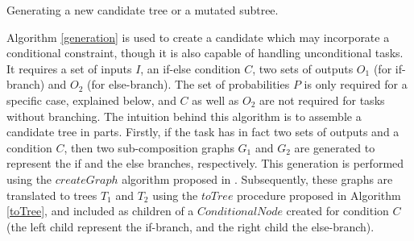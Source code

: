 \begin{algorithm}
 \setlength{}
 \LinesNumbered
 \SetNlSty{}{}{:}
 \vspace{2mm}
 \caption{\footnotesize Generating a new candidate tree or a mutated subtree.}
\label{generation}
\end{algorithm}

Algorithm \ref{generation} is used to create a candidate which may incorporate a conditional constraint, though it is also capable of handling unconditional tasks. It requires a
set of inputs $I$, an if-else condition $C$, two sets of outputs $O_1$ (for if-branch) and $O_2$ (for else-branch). The set of probabilities $P$ is only required for a specific case, explained below, and $C$ as well as $O_2$ are not required for tasks without branching. The intuition behind this algorithm is to assemble a candidate tree in parts. Firstly, if the task has in fact two sets of outputs and a condition $C$, then two sub-composition graphs $G_1$ and $G_2$ are generated to represent the if and the else branches, respectively. This generation is performed using the $createGraph$ algorithm proposed in \cite{wang2013genetic}. Subsequently, these graphs are translated to trees $T_1$ and $T_2$ using the $toTree$ procedure proposed in Algorithm \ref{toTree}, and included as children of a $ConditionalNode$ created for condition $C$ (the left child represent the if-branch, and the right child the else-branch).

